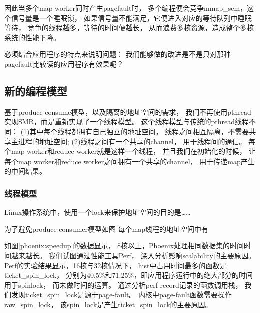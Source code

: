 因此当多个map worker同时产生pagefault时，
多个编程便会竞争mmap\_sem，这个信号量是一个睡眠锁，
如果信号量不能满足，它便进入对应的等待队列中睡眠等待，
竞争的线程越多，等待的时间便越长，
从而浪费多核资源，造成整个多核系统的性能下降。




必须结合应用程序的特点来说明问题：
我们能够做的改进是不是只对那种pagefault比较读的应用程序有效果呢？

\subsection{新的编程模型}
基于produce-consume模型，以及隔离的地址空间的需求，
我们不再使用pthread实现SMR，而是重新实现了一个线程模型。
这个线程模型与传统的pthread线程不同：
(1)其中每个线程都拥有自己独立的地址空间，
线程之间相互隔离，不需要共享主进程的地址空间;
(2)线程之间有一个共享的channel，
用于线程间的通信。
每个map worker和reduce worker就是这样一个线程，
并且我们在初始化的时候，
让每个map worker和reduce worker之间拥有一个共享的channel，
用于传递map产生的中间结果。


\subsubsection{线程模型}
Linux操作系统中，使用一个lock来保护地址空间的目的是……

为了避免produce-consumer模型如图
每个map线程的地址空间中有




















如图\ref{phoenix:speedup}的数据显示，
8核以上，Phoenix处理相同数据集的时间时间越来越长。
我们试图通过性能工具Perf\cite{}，
深入分析影响scalability的主要原因。
Perf的实验结果显示，16核与32核情况下，
hist中占用时间最多的函数是ticket\_spin\_lock，
分别为40.5\%和71.25\%，即应用程序运行中的绝大部分的时间用于spinlock，
而未做时间的运算。
通过分析perf record记录的函数调用栈，
我们发现ticket\_spin\_lock是源于page-fault。
内核中page-fault函数需要操作raw\_spin\_lock，
该spin\_lock是产生ticket\_spin\_lock的主要原因。

